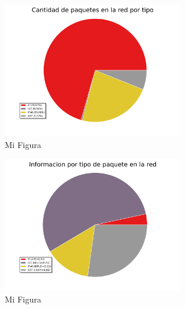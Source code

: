 \begin{figure}[h!]
  \centering
   \includegraphics[width=0.7\textwidth]{graficos/red_baufest_pie_type.png}
  \caption{Mi Figura}
  \label{fig:red_baufest_pie_type}
\end{figure}

\begin{figure}[h!]
  \centering
   \includegraphics[width=0.7\textwidth]{graficos/red_baufest_pie_type_information.png}
  \caption{Mi Figura}
  \label{fig:red_baufest_pie_type_information}
\end{figure}

